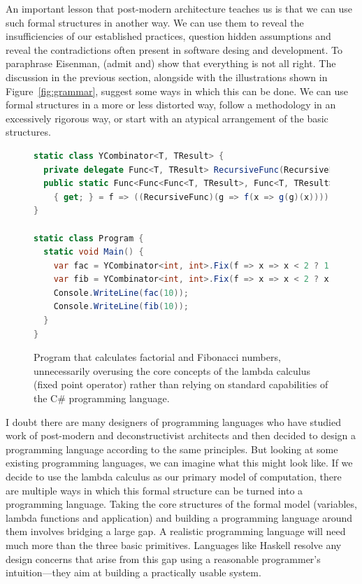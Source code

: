 An important lesson that post-modern architecture teaches us is that we can use such formal structures
in another way. We can use them to reveal the insufficiencies of our established practices, question
hidden assumptions and reveal the contradictions often present in software desing and development.
To paraphrase Eisenman, (admit and) show that everything is not all right. The
discussion in the previous section, alongside with the illustrations shown in Figure~\ref{fig:grammar},
suggest some ways in which this can be done. We can use formal structures in a more or less distorted way,
follow a methodology in an excessively rigorous way, or start with an atypical arrangement
of the basic structures.

\begin{figure}
\vspace{-1em}
\begin{lstlisting}[language=csharp]
static class YCombinator<T, TResult> {
  private delegate Func<T, TResult> RecursiveFunc(RecursiveFunc r);
  public static Func<Func<Func<T, TResult>, Func<T, TResult>>, Func<T, TResult>> Fix
    { get; } = f => ((RecursiveFunc)(g => f(x => g(g)(x))))(g => f(x => g(g)(x)));
}

static class Program {
  static void Main() {
    var fac = YCombinator<int, int>.Fix(f => x => x < 2 ? 1 : x * f(x - 1));
    var fib = YCombinator<int, int>.Fix(f => x => x < 2 ? x : f(x - 1) + f(x - 2));
    Console.WriteLine(fac(10));
    Console.WriteLine(fib(10));
  }
}
\end{lstlisting}
\vspace{-0.5em}
\caption{Program that calculates factorial and Fibonacci numbers, unnecessarily overusing
the core concepts of the lambda calculus (fixed point operator) rather than relying on
standard capabilities of the C\# programming language.}
\label{fig:ycombinator}
\vspace{-0.5em}
\end{figure}


I doubt there are many designers of programming languages who have studied work of post-modern
and deconstructivist architects and then decided to design a programming language according to
the same principles. But looking at some existing programming languages, we can imagine what
this might look like. If we decide to use the lambda calculus as our primary model of computation,
there are multiple ways in which this formal structure can be turned into a programming language.
Taking the core structures of the formal model (variables, lambda functions and application) and
building a programming language around them involves bridging a large gap.
A realistic programming language will need much more than the three basic primitives. Languages like
Haskell resolve any design concerns that arise from this gap using a reasonable programmer's
intuition---they aim at building a practically usable system.

